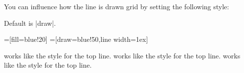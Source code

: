 \begin{itemize}
\begin{itemize}
\begin{codeexample}[]
\end{codeexample}
  \end{itemize}
  You can influence how the line is drawn grid by setting
  the following style:
  \begin{itemize}
    Default is |draw|.
\begin{codeexample}[]
=[fill=blue!20]    
=[draw=blue!50,line width=1ex]
\end{codeexample}
  \end{itemize}
  works like the style for the top line.
  works like the style for the top line.
  works like the style for the top line.
\end{itemize}






